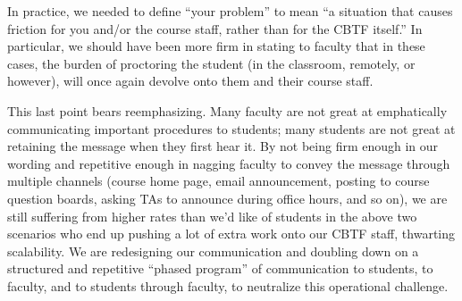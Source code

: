 In practice, we needed to define ``your problem'' to mean ``a
situation that causes friction for you and/or the course staff, rather
than for the CBTF itself.''  In particular, we should have been more
firm in stating to faculty that in these cases, the burden of
proctoring the student (in the classroom, remotely, or however), will
once again devolve onto them and their course staff.

This last point bears reemphasizing.  Many faculty are not great at
emphatically communicating important procedures to students; many
students are not great at retaining the message when they first hear
it.  By not being firm enough in our wording and repetitive enough in
nagging faculty to convey the message through multiple channels
(course home page, email announcement, posting to course question
boards, asking TAs to announce during office hours, and so on), we are
still suffering from higher rates than we'd like of students in the
above two scenarios who end up pushing a lot of extra work onto our
CBTF staff, thwarting scalability.  We are redesigning our
communication and doubling down on a structured and repetitive
``phased program'' of communication to students, to faculty, and to
students through faculty, to neutralize this operational challenge.
